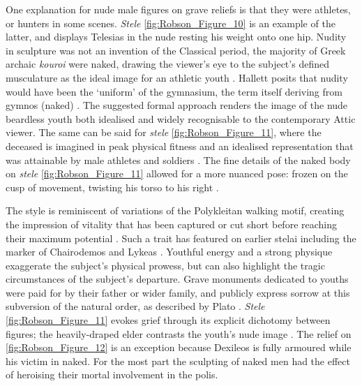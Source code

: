 One explanation for nude male figures on grave reliefs is that they were athletes, or hunters in some scenes. \textit{Stele} \ref{fig:Robson_Figure_10} is an example of the latter, and displays Telesias in the nude resting his weight onto one hip.
Nudity in sculpture was not an invention of the Classical period, the majority of Greek archaic \textit{kouroi} were naked, drawing the viewer’s eye to the subject’s defined musculature as the ideal image for an athletic youth \parencite[115]{Boardman1995}.
Hallett posits that nudity would have been the \enquote*{uniform} of the gymnasium, the term itself deriving from gymnos (naked) \parencite[22]{Hallett2005}.
The suggested formal approach renders the image of the nude beardless youth both idealised and widely recognisable to the contemporary Attic viewer. The same can be said for \textit{stele} \ref{fig:Robson_Figure_11}, where the deceased is imagined in peak physical fitness and an idealised representation that was attainable by male athletes and soldiers \parencite[94]{Stupperich1994}.
The fine details of the naked body on \textit{stele} \ref{fig:Robson_Figure_11} allowed for a more nuanced pose: frozen on the cusp of movement, twisting his torso to his right \parencite[200]{Osborne1998}.

The style is reminiscent of variations of the Polykleitan walking motif, creating the impression of vitality that has been captured or cut short before reaching their maximum potential \parencite[163]{Childs1998}.
Such a trait has featured on earlier stelai including the marker of Chairodemos and Lykeas \parencite[162]{Childs1998}.
Youthful energy and a strong physique exaggerate the subject’s physical prowess, but can also highlight the tragic circumstances of the subject’s departure. Grave monuments dedicated to youths were paid for by their father or wider family, and publicly express sorrow at this subversion of the natural order, as described by Plato \parencite[195]{Wasserman1969}. \textit{Stele} \ref{fig:Robson_Figure_11} evokes grief through its explicit dichotomy between figures;
the heavily-draped elder contrasts the youth’s nude image \parencite[116]{Boardman1995}.
The relief on \ref{fig:Robson_Figure_12} is an exception because Dexileos is fully armoured while his victim in naked. For the most part the sculpting of naked men had the effect of heroising their mortal involvement in the polis.

